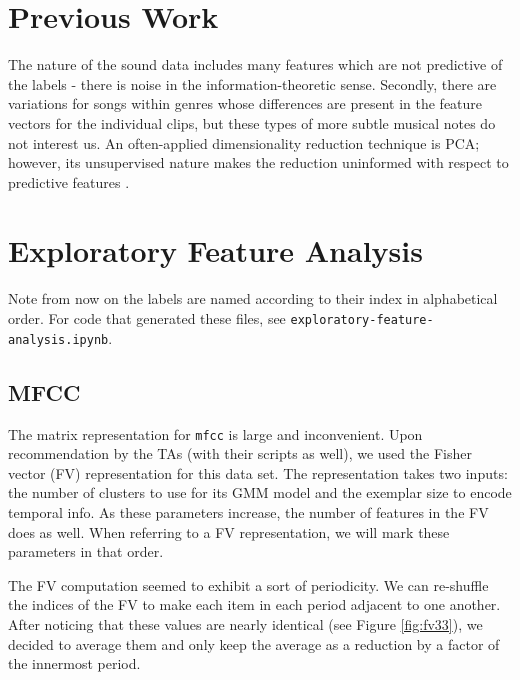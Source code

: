 \documentclass[9pt]{article}
\begin{document}
\vspace{-0.1in}
\section{Previous Work}
\vspace{-0.1in}

The nature of the sound data includes many features which are not predictive of the labels - there is noise in the information-theoretic sense. Secondly, there are variations for songs within genres whose differences are present in the feature vectors for the individual clips, but these types of more subtle musical notes do not interest us.
An often-applied dimensionality reduction technique is PCA; however, its unsupervised nature makes the reduction uninformed with respect to predictive features \cite{WellingNote}.

\vspace{-0.1in}
\section{Exploratory Feature Analysis}
\vspace{-0.1in}

Note from now on the labels are named according to their index in alphabetical order. For code that generated these files, see \texttt{exploratory-feature-analysis.ipynb}.

\vspace{-0.1in}
\subsection{MFCC}

The matrix representation for \texttt{mfcc} is large and inconvenient. Upon recommendation by the TAs (with their scripts as well), we used the Fisher vector (FV) representation for this data set. The representation takes two inputs: the number of clusters to use for its GMM model and the exemplar size to encode temporal info. As these parameters increase, the number of features in the FV does as well. When referring to a FV representation, we will mark these parameters in that order.

The FV computation seemed to exhibit a sort of periodicity. We can re-shuffle the indices of the FV to make each item in each period adjacent to one another. After noticing that these values are nearly identical (see Figure \ref{fig:fv33}), we decided to average them and only keep the average as a reduction by a factor of the innermost period.
\end{document}
